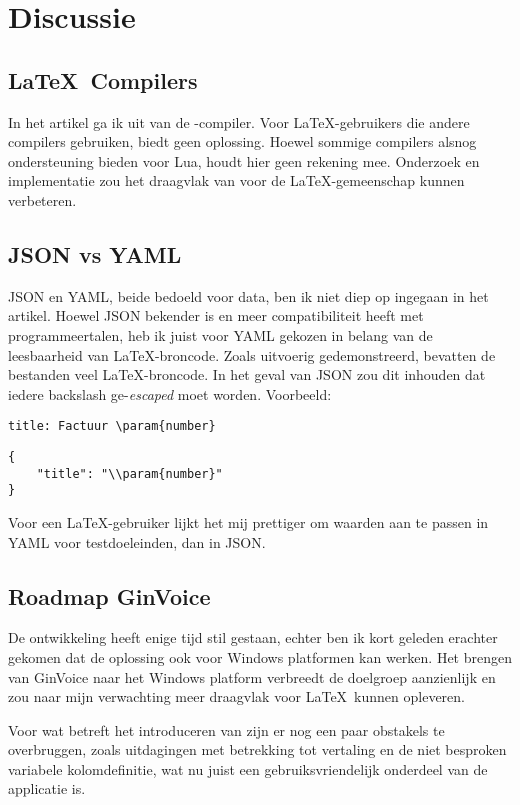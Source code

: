 \section{Discussie}

\subsection{\LaTeX\ Compilers}
In het artikel ga ik uit van de \LuaLaTeX-compiler.
Voor \LaTeX-gebruikers die andere compilers gebruiken, biedt  geen oplossing.
Hoewel sommige compilers alsnog ondersteuning bieden voor Lua, houdt  hier geen rekening mee.
Onderzoek en implementatie zou het draagvlak van  voor de \LaTeX-gemeenschap kunnen verbeteren.

\subsection{JSON vs YAML}
JSON en YAML, beide bedoeld voor data, ben ik niet diep op ingegaan in het artikel.
Hoewel JSON bekender is en meer compatibiliteit heeft met programmeertalen, heb ik juist voor YAML gekozen in belang van de leesbaarheid van \LaTeX-broncode.
Zoals uitvoerig gedemonstreerd, bevatten de bestanden veel \LaTeX-broncode.
In het geval van JSON zou dit inhouden dat iedere backslash ge-\textit{escaped} moet worden.
Voorbeeld:
\begin{lstlisting}[style=yaml,caption={YAML-voorbeeld}]
title: Factuur \param{number}
\end{lstlisting}
\begin{lstlisting}[style=json,caption={JSON-voorbeeld}]
{
    "title": "\\param{number}"
}
\end{lstlisting}
Voor een \LaTeX-gebruiker lijkt het mij prettiger om waarden aan te passen in YAML voor testdoeleinden, dan in JSON\@.

\subsection{Roadmap GinVoice}
De ontwikkeling heeft enige tijd stil gestaan, echter ben ik kort geleden erachter gekomen dat de oplossing ook voor Windows platformen kan werken.
Het brengen van GinVoice naar het Windows platform verbreedt de doelgroep aanzienlijk en zou naar mijn verwachting meer draagvlak voor \LaTeX\ kunnen opleveren.

Voor wat betreft het introduceren van  zijn er nog een paar obstakels te overbruggen, zoals uitdagingen met betrekking tot vertaling en de niet besproken variabele kolomdefinitie, wat nu juist een gebruiksvriendelijk onderdeel van de applicatie is.
